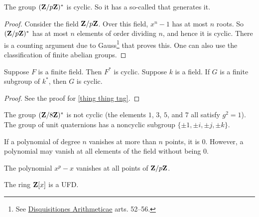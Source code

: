 \documentclass[11pt, oneside,margin=1in]{article}
\begin{document}
\begin{proposition}[ ]\label{thing thing tng}
The group $(\mathbf Z / p\mathbf Z)^*$ is cyclic. So it has a so-called  that generates it.
\end{proposition}
\begin{proof}
Consider the field $\mathbf Z / p\mathbf Z$. Over this field, $x^n-1$ has at most $n$ roots. So $(\mathbf Z / p\mathbf Z)^*$ has at most $n$ elements of order dividing $n$, and hence it is cyclic. There is a counting argument due to Gauss\footnote{See \underline{Disquisitiones Arithmeticae} arts. 52--56.} that proves this. One can also use the classification of finite abelian groups. 
\end{proof}
\begin{proposition}[ ]\label{}
Suppose $F$ is a finite field. Then $F^*$ is cyclic. Suppose $k$ is a field. If $G$ is a finite subgroup of $k^*$, then $G$ is cyclic.
\end{proposition}
\begin{proof}
See the proof for \cref{thing thing tng}.
\end{proof}
\begin{example}\label{}
The group $(\mathbf Z / 8\mathbf Z)^*$ is not cyclic (the elements $1$, $3$, $5$, and $7$ all satisfy $g^2=1$). The group of unit quaternions has a noncyclic subgroup $\{\pm 1,\pm i,\pm j,\pm k\}$.
\end{example}
\begin{warn}
	If a polynomial of degree $n$ vanishes at more than $n$ points, it is $0$. However, a polynomial may vanish at all elements of the field without being $0$.
\end{warn}
\begin{example}[ ]\label{}
The polynomial $x^p - x$ vanishes at all points of $\mathbf Z / p\mathbf Z$.
\end{example}
\begin{proposition}[ ]\label{}
The ring $\mathbf Z[x]$ is a UFD.
\end{proposition}
\end{document}
